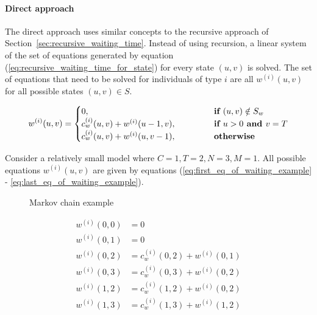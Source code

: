 \paragraph{Direct approach}\label{sec:direct_waiting_time}

The direct approach uses similar concepts to the recursive approach of
Section~\ref{sec:recursive_waiting_time}.
Instead of using recursion, a linear system of the set of equations generated by
equation (\ref{eq:recursive_waiting_time_for_state}) for every state \((u,v)\)
is solved.
The set of equations that need to be solved for individuals of type \(i\) are
all \( w^{(i)}(u, v) \) for all possible states \((u,v) \in S\).


\begin{equation*}
    w^{(i)}(u,v) =
    \begin{cases}
        0, \hspace{4.85cm} & \textbf{if } (u,v) \notin S_w \\
        c^{(i)}_w(u,v) + w^{(i)}(u-1, v), & \textbf{if } u > 0
        \textbf{ and } v = T \\
        c^{(i)}_w(u,v) + w^{(i)}(u, v-1), & \textbf{otherwise}
    \end{cases}
\end{equation*}

Consider a relatively small model where \(C=1, T=2, N=3, M=1\).
All possible equations \(w^{(i)}(u,v)\) are given by equations
(\ref{eq:first_eq_of_waiting_example} - \ref{eq:last_eq_of_waiting_example}).

\begin{minipage}{0.45\textwidth}
    \begin{figure}[H]
        \centering
        \scalebox{0.65}{}
        \caption{Markov chain example}
        \label{fig:example-algeb-waiting}
    \end{figure}
\end{minipage}
\begin{minipage}{0.5\textwidth}
    \begin{align}
        w^{(i)}(0,0) &= 0 \\
        w^{(i)}(0,1) &= 0 \\
        w^{(i)}(0,2) &= c^{(i)}_w(0,2) + w^{(i)}(0,1) \label{eq:first_eq_of_waiting_example} \\
        w^{(i)}(0,3) &= c^{(i)}_w(0,3) + w^{(i)}(0,2) \\
        w^{(i)}(1,2) &= c^{(i)}_w(1,2) + w^{(i)}(0,2) \\
        w^{(i)}(1,3) &= c^{(i)}_w(1,3) + w^{(i)}(1,2) \label{eq:last_eq_of_waiting_example}
    \end{align}
\end{minipage}

